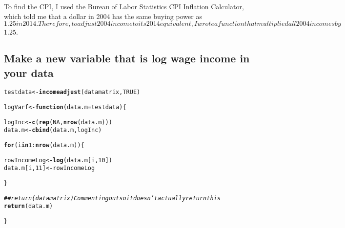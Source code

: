 \documentclass{article}\usepackage[]{graphicx}\usepackage[]{color}
\makeatletter
\newcommand{\hlnum}[1]{\textcolor[rgb]{0.686,0.059,0.569}{#1}}%
\newcommand{\hlcom}[1]{\textcolor[rgb]{0.678,0.584,0.686}{\textit{#1}}}%
\newcommand{\hlopt}[1]{\textcolor[rgb]{0,0,0}{#1}}%
\newcommand{\hlstd}[1]{\textcolor[rgb]{0.345,0.345,0.345}{#1}}%
\newcommand{\hlkwa}[1]{\textcolor[rgb]{0.161,0.373,0.58}{\textbf{#1}}}%
\newcommand{\hlkwb}[1]{\textcolor[rgb]{0.69,0.353,0.396}{#1}}%
\newcommand{\hlkwc}[1]{\textcolor[rgb]{0.333,0.667,0.333}{#1}}%
\newcommand{\hlkwd}[1]{\textcolor[rgb]{0.737,0.353,0.396}{\textbf{#1}}}%
\newenvironment{kframe}{%
 \def\at@end@of@kframe{}%
 \ifinner\ifhmode%
  \def\at@end@of@kframe{\end{minipage}}%
  \begin{minipage}{\columnwidth}%
 \fi\fi%
 \def\FrameCommand##1{\hskip\@totalleftmargin \hskip-\fboxsep
 \colorbox{shadecolor}{##1}\hskip-\fboxsep
     \hskip-\linewidth \hskip-\@totalleftmargin \hskip\columnwidth}%
 \MakeFramed {\advance\hsize-\width
   \@totalleftmargin\z@ \linewidth\hsize
   \@setminipage}}%
 {\par\unskip\endMakeFramed%
 \at@end@of@kframe}
\newenvironment{knitrout}{}{} %
\makeatother
\begin{document}
To find the CPI, I used the Bureau of Labor Statistics CPI Inflation Calculator, which told me that a dollar in 2004 has the same buying power as $1.25 in 2014. Therefore, to adjust 2004 income to its 2014 equivalent, I wrote a function that multiplied all 2004 incomes by $1.25.

\subsection{Make a new variable that is log wage income in your data}

\begin{knitrout}
\color{fgcolor}\begin{kframe}
\begin{alltt}
\hlstd{testdata} \hlkwb{<-} \hlkwd{incomeadjust}\hlstd{(datamatrix,} \hlnum{TRUE}\hlstd{)}

\hlstd{logVarf} \hlkwb{<-} \hlkwa{function}\hlstd{(}\hlkwc{data.m} \hlstd{= testdata)\{}

  \hlstd{logInc} \hlkwb{<-} \hlkwd{c}\hlstd{(}\hlkwd{rep}\hlstd{(}\hlnum{NA}\hlstd{,} \hlkwd{nrow}\hlstd{(data.m)))}
  \hlstd{data.m} \hlkwb{<-} \hlkwd{cbind}\hlstd{(data.m, logInc)}

  \hlkwa{for} \hlstd{(i} \hlkwa{in} \hlnum{1}\hlopt{:}\hlkwd{nrow}\hlstd{(data.m))\{}

    \hlstd{rowIncomeLog} \hlkwb{<-} \hlkwd{log}\hlstd{(data.m[i,}\hlnum{10}\hlstd{])}
    \hlstd{data.m[i,}\hlnum{11}\hlstd{]} \hlkwb{<-} \hlstd{rowIncomeLog}

  \hlstd{\}}

  \hlcom{## return(datamatrix) Commenting out so it doesn't actually return this}
  \hlkwd{return}\hlstd{(data.m)}

\hlstd{\}}


\end{alltt}
\end{kframe}
\end{knitrout}
\end{document}
